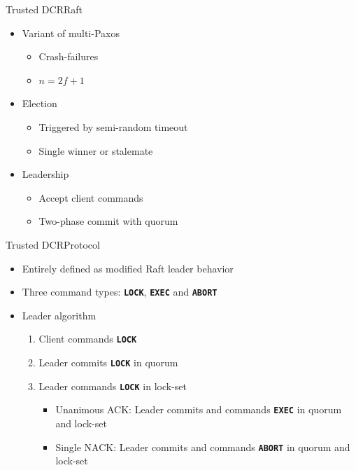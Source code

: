 \documentclass{beamer}
\begin{document}
\begin{frame}{Trusted DCR}{Raft}%
  \begin{itemize}
    \item Variant of multi-Paxos
    \begin{itemize}
      \item Crash-failures
      \item $n = 2f+1$
    \end{itemize}

    \vfill

    \item Election
    \begin{itemize}
      \item Triggered by semi-random timeout
      \item Single winner or stalemate
    \end{itemize}

    \vfill

    \item Leadership
    \begin{itemize}
      \item Accept client commands
      \item Two-phase commit with quorum
    \end{itemize}
  \end{itemize}

\end{frame}

\begin{frame}{Trusted DCR}{Protocol}%
  \begin{itemize}
    \item Entirely defined as modified Raft leader behavior
    \item Three command types: \textbf{\texttt{LOCK}}, \textbf{\texttt{EXEC}} and \textbf{\texttt{ABORT}}

    \vfill

    \item Leader algorithm
    \begin{enumerate}
      \item Client commands \textbf{\texttt{LOCK}}
      \item Leader commits \textbf{\texttt{LOCK}} in quorum
      \item Leader commands \textbf{\texttt{LOCK}} in lock-set
      \begin{itemize}
        \item Unanimous ACK: Leader commits and commands \textbf{\texttt{EXEC}} in quorum and lock-set
        \item Single NACK: Leader commits and commands \textbf{\texttt{ABORT}} in quorum and lock-set
      \end{itemize}
    \end{enumerate}
  \end{itemize}
\end{frame}
\end{document}
